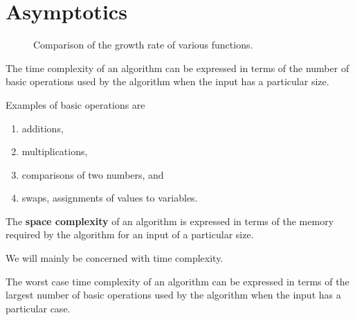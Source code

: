 \chapter{Asymptotics}

\begin{figure}[H]
    \centering
    \caption{Comparison of the growth rate of various functions.}
    \label{fig:bigo_comparison}
\end{figure}

\begin{definition}
    The time complexity of an algorithm can be expressed in terms of the number of basic operations used by the algorithm when the input has a particular size.
    
    Examples of basic operations are
    \begin{enumerate}
        \item additions,
        \item multiplications,
        \item comparisons of two numbers, and
        \item swaps, assignments of values to variables.
    \end{enumerate}
\end{definition}

\begin{definition}
    The \textbf{space complexity} of an algorithm is expressed in terms of the memory required by the algorithm for an input of a particular size. 
\end{definition}

We will mainly be concerned with time complexity.

\begin{definition}
    The worst case time complexity of an algorithm can be expressed in terms of the largest number of basic operations used by the algorithm when the input has a particular case.
\end{definition}

